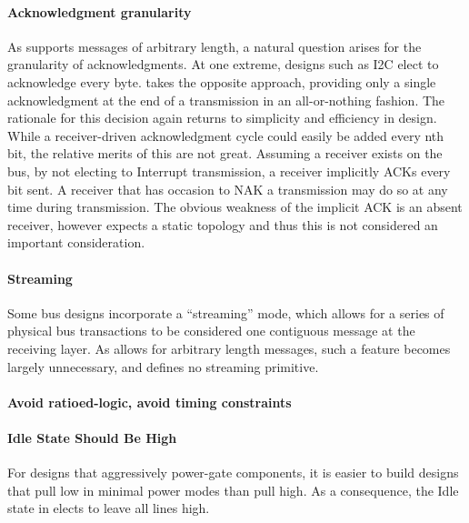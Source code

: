 \paragraph{Acknowledgment granularity}
As \bus supports messages of arbitrary length, a natural question arises for
the granularity of acknowledgments. At one extreme, designs such as I2C elect
to acknowledge every byte. \bus takes the opposite approach, providing only a
single acknowledgment at the end of a transmission in an all-or-nothing
fashion. The rationale for this decision again returns to simplicity and
efficiency in design. While a receiver-driven acknowledgment cycle could
easily be added every nth bit, the relative merits of this are not great.
Assuming a receiver exists on the bus, by not electing to Interrupt
transmission, a receiver implicitly ACKs every bit sent. A receiver that has
occasion to NAK a transmission may do so at any time during transmission. The
obvious weakness of the implicit ACK is an absent receiver, however \bus
expects a static topology and thus this is not considered an important
consideration.

\paragraph{Streaming}
Some bus designs incorporate a ``streaming'' mode, which allows for a series
of physical bus transactions to be considered one contiguous message at the
receiving layer. As \bus allows for arbitrary length messages, such a feature
becomes largely unnecessary, and \bus defines no streaming primitive.

\paragraph{Avoid ratioed-logic, avoid timing constraints}

\paragraph{Idle State Should Be High}
For designs that aggressively power-gate components, it is easier to build
designs that pull low in minimal power modes than pull high. As a consequence,
the Idle state in \bus elects to leave all lines high.

